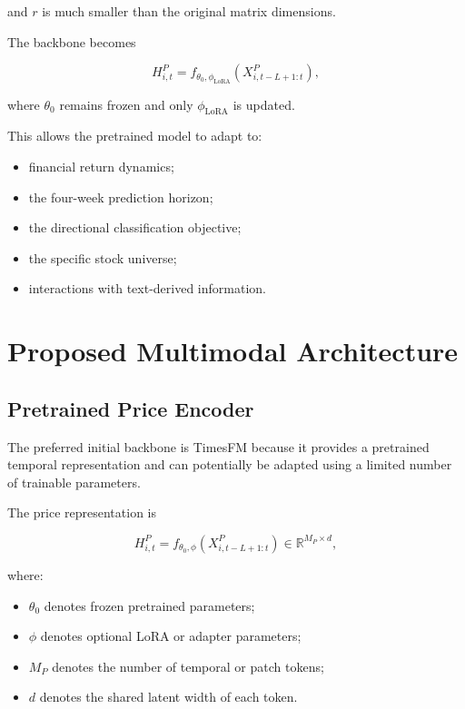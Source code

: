 \documentclass[11pt]{article}
\newcommand{\R}{\mathbb{R}}
\begin{document}
and $r$ is much smaller than the original matrix dimensions.

The backbone becomes

\begin{equation}
H^P_{i,t}
=
f_{\theta_0,\phi_{\mathrm{LoRA}}}
\left(
X^P_{i,t-L+1:t}
\right),
\end{equation}

where $\theta_0$ remains frozen and only $\phi_{\mathrm{LoRA}}$ is updated.

This allows the pretrained model to adapt to:

\begin{itemize}
    \item financial return dynamics;
    \item the four-week prediction horizon;
    \item the directional classification objective;
    \item the specific stock universe;
    \item interactions with text-derived information.
\end{itemize}

\section{Proposed Multimodal Architecture}

\subsection{Pretrained Price Encoder}

The preferred initial backbone is TimesFM because it provides a pretrained
temporal representation and can potentially be adapted using a limited number
of trainable parameters.

The price representation is

\begin{equation}
H^P_{i,t}
=
f_{\theta_0,\phi}
\left(
X^P_{i,t-L+1:t}
\right)
\in
\R^{M_P\times d},
\end{equation}

where:

\begin{itemize}
    \item $\theta_0$ denotes frozen pretrained parameters;
    \item $\phi$ denotes optional LoRA or adapter parameters;
    \item $M_P$ denotes the number of temporal or patch tokens;
    \item $d$ denotes the shared latent width of each token.
\end{itemize}
\end{document}
